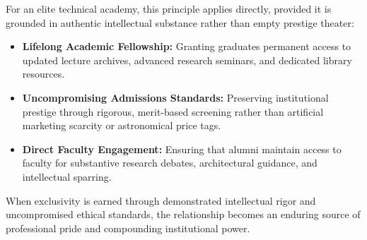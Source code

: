 For an elite technical academy, this principle applies directly, provided it is grounded in authentic intellectual substance rather than empty prestige theater:
\begin{itemize}[leftmargin=*]
\item \textbf{Lifelong Academic Fellowship:} Granting graduates permanent access to updated lecture archives, advanced research seminars, and dedicated library resources.
\item \textbf{Uncompromising Admissions Standards:} Preserving institutional prestige through rigorous, merit-based screening rather than artificial marketing scarcity or astronomical price tags.
\item \textbf{Direct Faculty Engagement:} Ensuring that alumni maintain access to faculty for substantive research debates, architectural guidance, and intellectual sparring.
\end{itemize}

When exclusivity is earned through demonstrated intellectual rigor and uncompromised ethical standards, the relationship becomes an enduring source of professional pride and compounding institutional power.

